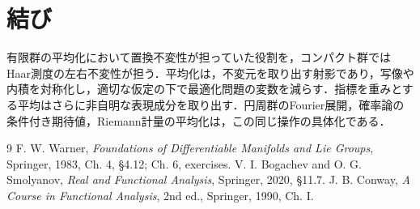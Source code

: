 \documentclass[a5paper,10pt,onecolumn]{jsarticle}
\theoremstyle{mathnotetheorem}
\begin{document}
\section{結び}
有限群の平均化において置換不変性が担っていた役割を，コンパクト群ではHaar測度の左右不変性が担う．平均化は，不変元を取り出す射影であり，写像や内積を対称化し，適切な仮定の下で最適化問題の変数を減らす．指標を重みとする平均はさらに非自明な表現成分を取り出す．円周群のFourier展開，確率論の条件付き期待値，Riemann計量の平均化は，この同じ操作の具体化である．

\begin{thebibliography}{9}
 F. W. Warner, \textit{Foundations of Differentiable Manifolds and Lie Groups}, Springer, 1983, Ch. 4, \S4.12; Ch. 6, exercises.
 V. I. Bogachev and O. G. Smolyanov, \textit{Real and Functional Analysis}, Springer, 2020, \S11.7.
 J. B. Conway, \textit{A Course in Functional Analysis}, 2nd ed., Springer, 1990, Ch. I.
\end{thebibliography}
\end{document}
